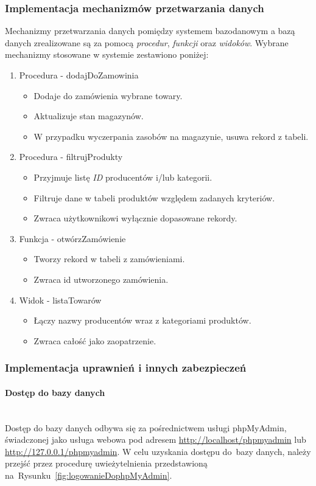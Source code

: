 \documentclass[a4paper, 12pt]{article}
\begin{document}
\subsubsection{Implementacja mechanizmów przetwarzania danych}
Mechanizmy przetwarzania danych pomiędzy systemem bazodanowym a bazą danych zrealizowane są za pomocą \textit{procedur}, \textit{funkcji} oraz \textit{widoków}. Wybrane mechanizmy stosowane w systemie zestawiono poniżej:

\begin{enumerate}
\item Procedura - dodajDoZamowinia
\begin{itemize}
\item Dodaje do zamówienia wybrane towary.
\item Aktualizuje stan magazynów.
\item W przypadku wyczerpania zasobów na magazynie, usuwa rekord z tabeli.
\end{itemize}
\item Procedura - filtrujProdukty
\begin{itemize}
\item Przyjmuje listę \textit{ID} producentów i/lub kategorii.
\item Filtruje dane w tabeli produktów względem zadanych kryteriów.
\item Zwraca użytkownikowi wyłącznie dopasowane rekordy.
\end{itemize}
\item Funkcja - otwórzZamówienie
\begin{itemize}
\item Tworzy rekord w tabeli z zamówieniami.
\item Zwraca id utworzonego zamówienia.
\end{itemize}
\item Widok - listaTowarów
\begin{itemize}
\item Łączy nazwy producentów wraz z kategoriami produktów.
\item Zwraca całość jako zaopatrzenie.
\end{itemize}
\end{enumerate}

\subsubsection{Implementacja uprawnień i innych zabezpieczeń}
\paragraph{Dostęp do bazy danych} \mbox{}\\
Dostęp do bazy danych odbywa się za pośrednictwem usługi phpMyAdmin, świadczonej jako usługa webowa pod adresem \url{http://localhost/phpmyadmin} lub \url{http://127.0.0.1/phpmyadmin}. W celu uzyskania dostępu do~bazy danych, należy przejść przez procedurę uwieżytelnienia przedstawioną na~Rysunku~\ref{fig:logowanieDophpMyAdmin}.
\end{document}
